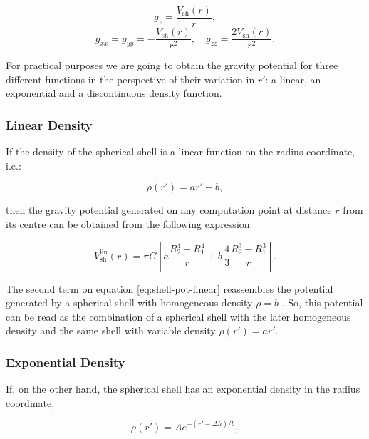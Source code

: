 \documentclass[extra]{gji}
\begin{document}

\begin{equation}
    g_z = \frac{V_\text{sh}(r)}{r},
\end{equation}
\begin{equation}
    g_{xx} = g_{yy} = -\frac{V_\text{sh}(r)}{r^2}, \quad
    g_{zz} = \frac{2V_\text{sh}(r)}{r^2}.
\end{equation}

For practical purposes we are going to obtain the gravity potential for three different functions in the perspective of their variation in $r'$: a linear, an exponential and a discontinuous density function.


\subsubsection{Linear Density}

If the density of the spherical shell is a linear function on the radius coordinate, i.e.:

\begin{equation}
    \rho(r') = ar' + b,
\end{equation}

\noindent then the gravity potential generated on any computation point at distance $r$ from its centre can be obtained from the following expression:

\begin{equation}
    V_\text{sh}^\text{lin}(r) = \pi G \left[ 
    a \frac{R_2^4 - R_1^4}{r} +
    b \,\frac{4}{3} \frac{R_2^3 - R_1^3}{r} \right].
    \label{eq:shell-pot-linear}
\end{equation}

The second term on equation \ref{eq:shell-pot-linear} reassembles the potential generated by a spherical shell with homogeneous density $\rho = b$ \citep{Mikuska2006,Grombein2013}.
So, this potential can be read as the combination of a spherical shell with the later homogeneous density and the same shell with variable density $\rho(r') = ar'$.


\subsubsection{Exponential Density}

If, on the other hand, the spherical shell has an exponential density in the radius coordinate,

\begin{equation}
    \rho(r') = Ae^{-(r' - \Delta h)/b},
\end{equation}
\end{document}
